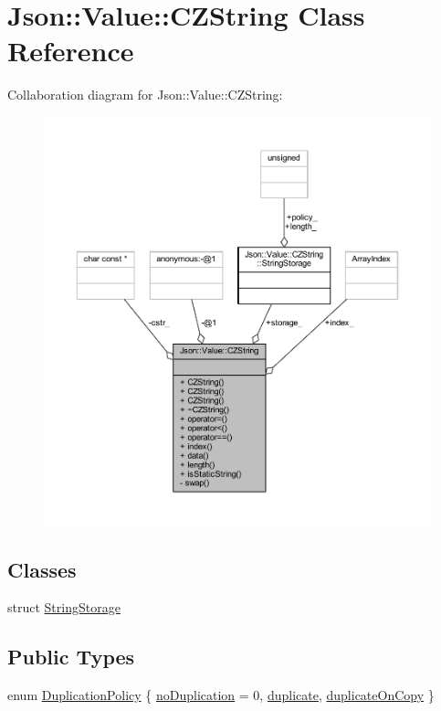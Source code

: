 \hypertarget{class_json_1_1_value_1_1_c_z_string}{}\section{Json\+:\+:Value\+:\+:C\+Z\+String Class Reference}
\label{class_json_1_1_value_1_1_c_z_string}


Collaboration diagram for Json\+:\+:Value\+:\+:C\+Z\+String\+:\nopagebreak
\begin{figure}[H]
\begin{center}
\leavevmode
\includegraphics[width=350pt]{class_json_1_1_value_1_1_c_z_string__coll__graph}
\end{center}
\end{figure}
\subsection*{Classes}
\begin{DoxyCompactItemize}
\item 
struct \hyperlink{struct_json_1_1_value_1_1_c_z_string_1_1_string_storage}{String\+Storage}
\end{DoxyCompactItemize}
\subsection*{Public Types}
\begin{DoxyCompactItemize}
\item 
enum \hyperlink{class_json_1_1_value_1_1_c_z_string_a2805c46fb4a72bbaed55de6d75941b6d}{Duplication\+Policy} \{ \hyperlink{class_json_1_1_value_1_1_c_z_string_a2805c46fb4a72bbaed55de6d75941b6da08d540450fa6c4af57eaacf063eedd20}{no\+Duplication} = 0, 
\hyperlink{class_json_1_1_value_1_1_c_z_string_a2805c46fb4a72bbaed55de6d75941b6dabb2134294dd8fc37dd82d18bb794fe20}{duplicate}, 
\hyperlink{class_json_1_1_value_1_1_c_z_string_a2805c46fb4a72bbaed55de6d75941b6da5c18c35205a3be63ad14ce659e70fe7d}{duplicate\+On\+Copy}
 \}
\end{DoxyCompactItemize}
